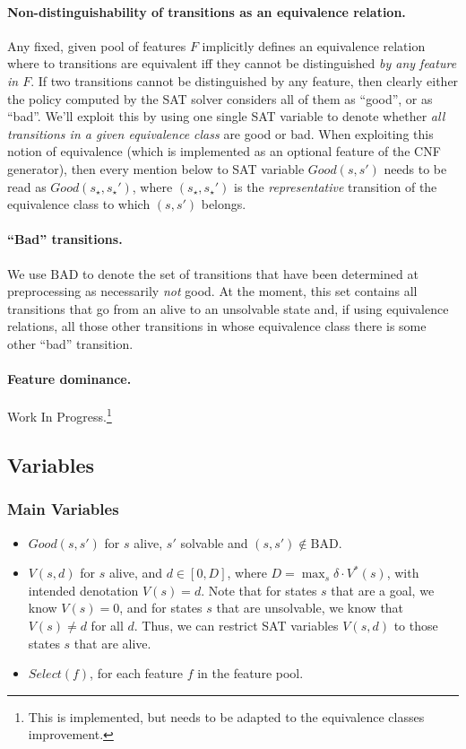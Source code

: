 \documentclass[a4paper]{article}
\newcommand{\badtx}{\ensuremath{\mathrm{BAD}}}
\begin{document}
\paragraph{Non-distinguishability of transitions as an equivalence relation.}
Any fixed, given pool of features $F$ implicitly defines an equivalence relation where to transitions are
equivalent iff they cannot be distinguished \emph{by any feature in $F$}.
If two transitions cannot be distinguished by any feature, then clearly either the policy computed by the SAT solver
considers all of them as ``good'', or as ``bad''.
We'll exploit this by using one single SAT variable to denote whether \emph{all transitions in a given equivalence
class} are good or bad. When exploiting this notion of equivalence (which is implemented as an optional feature of
the CNF generator), then every mention below to SAT variable $Good(s, s')$ needs to be read as $Good(s_{\star}, s_{\star}')$,
where $(s_{\star}, s_{\star}')$ is the \emph{representative} transition of the equivalence class to which $(s, s')$ belongs.

\paragraph{``Bad'' transitions.}
We use \badtx{} to denote the set of transitions that have been determined at preprocessing as necessarily
\emph{not} good.
At the moment, this set contains all transitions that go from an alive to an unsolvable state and, if using
equivalence relations, all those other transitions in whose equivalence class there is some other ``bad'' transition.


\paragraph{Feature dominance.}
Work In Progress.\footnote{This is implemented, but needs to be adapted to the equivalence classes improvement.}

\newpage

\subsection{Variables}

\subsubsection{Main Variables}
\begin{itemize}
 \item $Good(s, s')$ for $s$ alive, $s'$ solvable and $(s, s') \not\in \badtx$.

 \item $V(s, d)$ for $s$ alive, and $d \in [0, D]$, where $D = \max_{s} \delta \cdot V^*(s)$,
 with intended denotation $V(s)=d$.
 Note that for states $s$ that are a goal, we know $V(s)=0$,
 and for states $s$ that are unsolvable, we know that $V(s) \neq d$ for all $d$.
 Thus, we can restrict SAT variables $V(s, d)$ to those states $s$ that are alive.

 \item $Select(f)$, for each feature $f$ in the feature pool.
\end{itemize}
\end{document}
